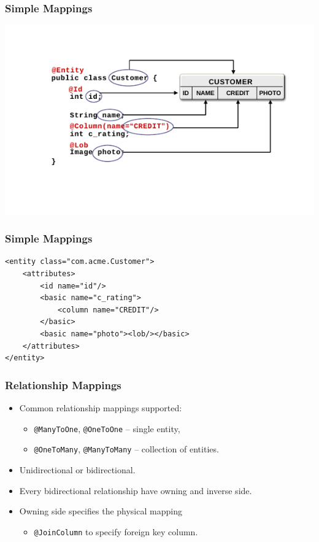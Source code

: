 \documentclass[10pt,xcolor=pdflatex]{beamer}
\begin{document}
\begin{frame}\frametitle{Simple Mappings}
	\centering\includegraphics[width=.95\paperwidth]{img/pic2.png}
\end{frame}


\begin{frame}[fragile]\frametitle{Simple Mappings}
\lstset{language=XML}
\begin{lstlisting}
<entity class="com.acme.Customer">
    <attributes>
        <id name="id"/>
        <basic name="c_rating">
            <column name="CREDIT"/>
        </basic>
        <basic name="photo"><lob/></basic>
    </attributes>
</entity>
\end{lstlisting}
\end{frame}


\begin{frame}\frametitle{Relationship Mappings}
	\begin{itemize}
		\item Common relationship mappings supported:
          \begin{itemize}
        	\item \texttt{@ManyToOne}, \texttt{@OneToOne} -- single entity,
        	\item \texttt{@OneToMany}, \texttt{@ManyToMany} -- collection of entities.
          \end{itemize}
		\item Unidirectional or bidirectional.
		\item Every bidirectional relationship have owning and inverse side.
		\item Owning side specifies the physical mapping
        \begin{itemize}
        	\item \texttt{@JoinColumn} to specify foreign key column.
        \end{itemize}
	\end{itemize}
\end{frame}
\end{document}
